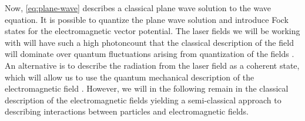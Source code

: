         Now, \autoref{eq:plane-wave} describes a classical plane wave solution
        to the wave equation.
        It is possible to quantize the plane wave solution and introduce Fock
        states for the electromagnetic vector potential.
        The laser fields we will be working with will have such a high
        photoncount that the classical description of the field will dominate
        over quantum fluctuations arising from quantization of the fields
        \cite{joachain2012atoms}.
        An alternative is to describe the radiation from the laser field as a
        coherent state, which will allow us to use the quantum mechanical
        description of the electromagnetic field \cite{joachain2012atoms,
        modern-qm}.
        However, we will in the following remain in the classical description of
        the electromagnetic fields yielding a semi-classical approach to
        describing interactions between particles and electromagnetic fields.

